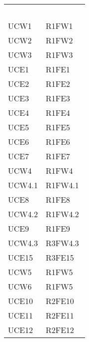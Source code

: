 \begin{table}[!htbp]
\renewcommand{\arraystretch}{1.5}
\begin{tabular}[t]{ m{}<{\centering}  m{}<{\centering} }
	\rowcolor{darkblue}
	\textcolor{white}{\textbf{Fonte}} &\textcolor{white}{\textbf{Requisiti}}\\ 

	UCW1 & R1FW1\\	
	 
	UCW2 & R1FW2\\	

	UCW3 & R1FW3\\	
	 
	UCE1 & R1FE1\\	
	 
	UCE2 & R1FE2\\	
	 
	UCE3 & R1FE3\\	

	UCE4 & R1FE4\\	
	
	UCE5 & R1FE5\\
	 
	UCE6 & R1FE6\\	 
	 
	UCE7 & R1FE7\\	

	UCW4 & R1FW4\\ 
	 
	UCW4.1 & R1FW4.1\\	
	 
	UCE8 & R1FE8 \\	
	 
	UCW4.2 & R1FW4.2\\		 

	UCE9 & R1FE9\\		
	 
	UCW4.3 & R3FW4.3 \\				
	 
	UCE15 & R3FE15\\			
	  	 	 	
	UCW5 & R1FW5\\		
	 
	UCW6 & R1FW5 \\
	
	UCE10 & R2FE10 \\
	
	UCE11 & R2FE11\\
	 
	UCE12 & R2FE12 \\			
	 

\end{tabular}
\end{table}
